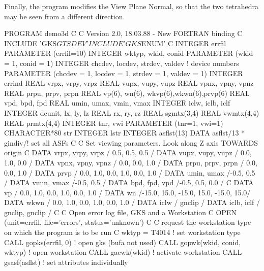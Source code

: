 Finally, the program modifies the View Plane Normal, so that the two
tetrahedra may be seen from a different direction.
\begin{XMP}
      PROGRAM demo3d
C
C     Version 2.0, 18.03.88    - New FORTRAN binding
C
      INCLUDE  'GKS$GTSDEV'
      INCLUDE  'GKS$ENUM'
C
      INTEGER      errfil
      PARAMETER   (errfil=10)
      INTEGER      wktyp, wkid,  conid
      PARAMETER   (wkid = 1, conid = 1)
      INTEGER      chcdev, locdev, strdev, valdev  ! device numbers
      PARAMETER   (chcdev = 1, locdev = 1, strdev = 1, valdev = 1)
      INTEGER      errind
      REAL         vrpx,   vrpy,   vrpz
      REAL         vupx,   vupy,   vupz
      REAL         vpnx,   vpny,   vpnz
      REAL         prpu,   prpv,   prpn
      REAL         vp(6),  wn(6),  wkvp(6),wkwn(6),prvp(6)
      REAL         vpd,    bpd,    fpd
      REAL         umin,   umax,   vmin,   vmax
      INTEGER      iclw,   iclb,   iclf
      INTEGER      dcunit, lx,     ly,     lz
      REAL         rx,     ry,     rz
      REAL         sgmtx(3,4)
      REAL         vwmtx(4,4)
      REAL         prmtx(4,4)
      INTEGER      tnr,    vwi
      PARAMETER   (tnr=1,  vwi=1)
      CHARACTER*80 str
      INTEGER      lstr
      INTEGER      asflst(13)
      DATA         asflst/13 * gindiv/! set all ASFs
C
C     Set viewing parameters. Look along Z axis TOWARDS origin
C
      DATA         vrpx, vrpy, vrpz / 0.5, 0.5, 0.5 /
      DATA         vupx, vupy, vupz / 0.0, 1.0, 0.0 /
      DATA         vpnx, vpny, vpnz / 0.0, 0.0, 1.0 /
      DATA         prpu, prpv, prpn / 0.0, 0.0, 1.0 /
      DATA         prvp             / 0.0, 1.0, 0.0, 1.0, 0.0, 1.0 /
      DATA         umin, umax       /-0.5, 0.5 /
      DATA         vmin, vmax       /-0.5, 0.5 /
      DATA         bpd,  fpd, vpd   /-0.5, 0.5, 0.0 /
C
      DATA         vp         / 0.0, 1.0, 0.0, 1.0, 0.0, 1.0 /
      DATA         wn         /-15.0, 15.0, -15.0, 15.0, -15.0, 15.0/
      DATA         wkwn       / 0.0, 1.0, 0.0, 1.0, 0.0, 1.0 /
      DATA         iclw       / gnclip /
      DATA         iclb, iclf / gnclip, gnclip /
C
C     Open error log file, GKS and a Workstation
C
      OPEN (unit=errfil, file='errors', status='unknown')
C
C  request the workstation type on which the program is to be run
C
      wktyp = T4014                   ! set workstation type
      CALL gopks(errfil, 0)           ! open gks (bufa not used)
      CALL gopwk(wkid, conid, wktyp)  ! open workstation
      CALL gacwk(wkid)                ! activate workstation
      CALL gsasf(asflst)              ! set attributes individually

\end{XMP}
